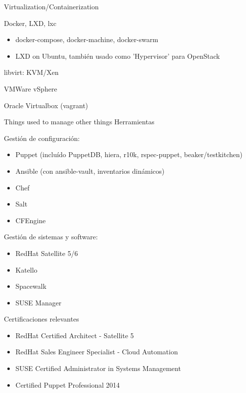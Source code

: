 \begin{cventries}
    {Virtualization/Containerization}
    {}
    {}
    {
      \begin{cvitems}
        \item Docker, LXD, lxc
          \begin{itemize}
            \item docker-compose, docker-machine, docker-swarm
            \item LXD on Ubuntu, también usado como 'Hypervisor' para OpenStack
          \end{itemize}
        \item libvirt: KVM/Xen
        \item VMWare vSphere
        \item Oracle Virtualbox (vagrant)
      \end{cvitems}
    }
  \cventry
    {Things used to manage other things}
    {Herramientas}
    {}
    {}
    {
      \begin{cvitems}
      \item Gestión de configuración:
          \begin{itemize}
            \item Puppet (incluído PuppetDB, hiera, r10k, rspec-puppet, beaker/testkitchen)
            \item Ansible (con ansible-vault, inventarios dinámicos)
            \item Chef
            \item Salt
            \item CFEngine
          \end{itemize}
        \item Gestión de sistemas y software:
        \begin{itemize}
          \item RedHat Satellite 5/6
          \item Katello
          \item Spacewalk
          \item SUSE Manager
        \end{itemize}
        \item Certificaciones relevantes
          \begin{itemize}
            \item RedHat Certified Architect - Satellite 5
            \item RedHat Sales Engineer Specialist - Cloud Automation
            \item SUSE Certified Administrator in Systems Management
            \item Certified Puppet Professional 2014

\end{itemize}
\end{cvitems}}
\end{cventries}
